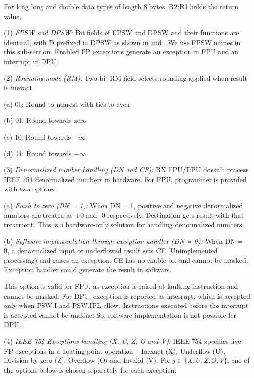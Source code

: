 For long long and double data types of length 8 bytes, R2:R1 holds the return value.



\SOPNoteBody

(1) \emph{FPSW and DPSW:} %
Bit fields of FPSW and DPSW and their functions are identical, with D prefixed in DPSW as shown in 
 and . We use 
FPSW names in this sub-section. Enabled FP exceptions generate an exception in FPU and 
an interrupt in DPU.

(2) \emph{Rounding mode (RM):} %
Two-bit RM field selects rounding applied when result is inexact

    \leveltwo
    (a) 00: Round to nearest with ties to even
    
    (b) 01: Round towards zero
    
    (c) 10: Round towards $+\infty$ 
    
    (d) 11: Round towards $-\infty$

\levelone
(3) \emph{Denormalized number handling (DN and CE):} %
RX FPU/DPU doesn't process IEEE 754 denormalized numbers in hardware. For FPU, programmer is provided 
with two options:

    \leveltwo
    (a) \emph{Flush to zero (DN = 1):} %
    When DN = 1, positive and negative denormalized numbers are treated as +0 and -0 respectively.
    Destination gets result with that treatment. This is a hardware-only solution for handling 
    denormalized numbers.

    (b) \emph{Software implementation through exception handler (DN = 0):} %
    When DN = 0, a denormalized input or underflowed result sets CE (Unimplemented processing) and
    raises an exception. CE has no enable bit and cannot be masked. Exception handler could generate
    the result in software.

    This option is valid for FPU, as exception is raised at faulting instruction and cannot be
    masked. For DPU, exception is reported as interrupt, which is accepted only when PSW.I and 
    PSW.IPL allow. Instructions executed before the interrupt is accepted cannot be undone. 
    So, software implementation is not possible for DPU.

\levelone    
(4) \emph{IEEE 754 Exceptions handling (X, U, Z, O and V):} %
IEEE 754 specifies five FP exceptions in a floating point operation -- Inexact (X), Underflow (U), 
Division by zero (Z), Overflow (O) and Invalid (V). For $j \in \{X, U, Z, O, V\}$, one of the 
options below is chosen separately for each exception:

